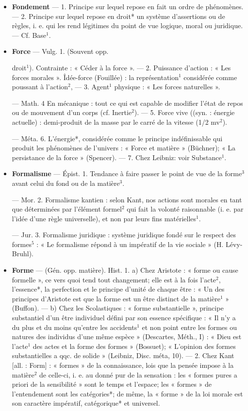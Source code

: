 \begin{itemize}[leftmargin=1cm, label=, itemsep=1pt]
\item {\bf Fondement} — 1. Principe sur lequel
repose en fait un ordre de phénomènes. — 2. Principe sur lequel
repose en droit* un système d’assertions ou de règles, i. e. qui les rend
légitimes du point de vue logique,
moral ou juridique. — Cf. Base$^1$.

\item {\bf Force} — Vulg. 1. (Souvent opp.

droit$^1$). Contrainte : « Céder à la
force ». — 2. Puissance d'action :
« Les forces morales ». Îdée-force
(Fouillée) : la représentation$^1$ considérée comme poussant à l’action$^2$,
— 3. Agent$^1$ physique : « Les forces
naturelles ».

— Math. 4 En mécanique : tout
ce qui est capable de modifier l’état
de repos ou de mouvement d’un
corps (cf. Inertie$^2$). — 5. Force vive
((syn. : énergie actuelle) : demi-produit de la masse par le carré de la
vitesse (1/2 mv$^2$).

— Méta. 6. L’énergie*, considérée
comme le principe indéfinissable
qui produit les phénomènes de l’univers : « Force et matière » (Büchner);
« La persistance de la force » (Spencer).
— 7. Chez Leibniz: voir Substance$^1$.

\item {\bf Formalisme} — Épist. 1. Tendance à
faire passer le point de vue de la
forme$^3$ avant celui du fond ou de
la matière$^3$.

— Mor. 2. Formalisme kantien :
selon Kant, nos actions sont morales
en tant que déterminées par l’élément formel$^2$ qui fait la volonté
raisonnable (i. e. par l’idée d’une
règle universelle), et non par leurs
fins matérielles$^1$.

— Jur. 3. Formalisme juridique :
système juridique fondé sur le respect des formes$^5$ : « Le formalisme
répond à un impératif de la vie
sociale » (H. Lévy-Bruhl).

\item {\bf Forme} — (Gén. opp. matière). Hist.
1. a) Chez Aristote : « forme ou cause
formelle », ce vers quoi tend tout
changement; elle est à la fois l’acte$^2$,
l'essence*, la perfection et le principe d'unité de chaque être : « Un
des principes d’Aristote est que la
forme est un être distinct de la
matière$^1$ » (Buffon). — b) Chez les
Scolastiques : « forme substantielle »,
principe substantiel d’un être individuel défini par son essence spécifique : « Il n’y a du plus et du moins
qu'entre les accidents$^1$ et non point
entre les formes ou natures des individus d’une même espèce » (Descartes, Méth., I) : « Dieu est l’acte$^1$
des actes et la forme des formes »
(Bossuet); « L'opinion des formes
substantielles a qqc. de solide »
(Leibniz, Disc. méta, 10). — 2. Chez
Kant [all. : Form] : « formes » de la
connaissance, lois que la pensée
impose à la matière$^2$ de celle-ci, i. e.
au donné pur de la sensation : les
« formes pures a priori de la sensibilité » sont le temps et l’espace;
les « formes » de l’entendement sont
les catégories*; de même, la « forme »
de la loi morale est son caractère
impératif, catégorique* et universel.


\end{itemize}
